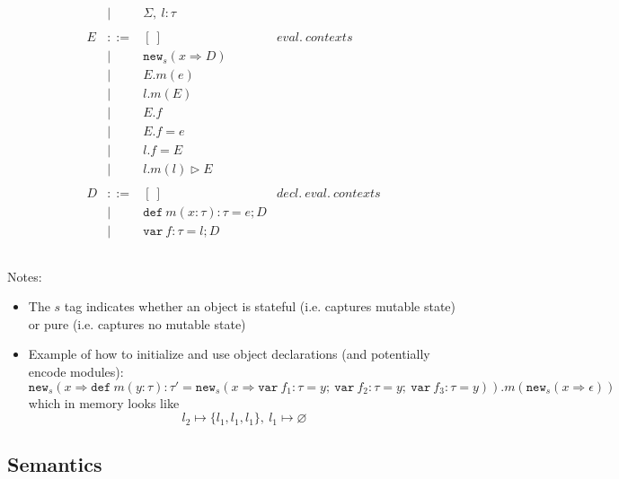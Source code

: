 \documentclass{llncs}
\newcommand{\keywadj}[1]{\mathtt{#1}}
\newcommand{\keyw}[1]{\keywadj{#1}~}
\begin{document}
\[\begin{array}{lll}
\begin{array}{lllr}
& | & \Sigma,~l : \tau\\
&&\\
E & ::= & [~] & eval.~ contexts\\
  & |   & \keywadj{new}_{s}(x \Rightarrow D) \\
  & |   & E.m(e)\\
  & |   & l.m(E)\\
  & |   & E.f \\
  & |   & E.f = e \\
  & |   & l.f = E \\
  & |   & l.m(l) \rhd E \\
&&\\
D & ::= & [~] & decl.~eval.~ contexts\\
  & |   & \keyw{def} m(x:\tau):\tau = e; D \\
  & |   & \keyw{var} f:\tau = l; D \\
&&\\
\end{array}
\end{array}
\]

Notes:

\begin{itemize}
\item The $s$ tag indicates whether an object is stateful (i.e. captures mutable state) or pure (i.e. captures no mutable state)
\item Example of how to initialize and use object declarations (and potentially encode modules):
\[
\keywadj{new}_{s}(x \Rightarrow \keyw{def} m(y : \tau) : \tau' = \keywadj{new}_{s}(x \Rightarrow \keyw{var} f_1 : \tau = y;~\keyw{var} f_2 : \tau = y;~\keyw{var} f_3 : \tau = y)).m(\keywadj{new}_{s} (x \Rightarrow \epsilon))
\]
which in memory looks like 
\[
l_2 \mapsto \{l_1,l_1,l_1\},~l_1 \mapsto \varnothing
\]
\end{itemize}


\newpage

\subsection{Semantics}
\end{document}
